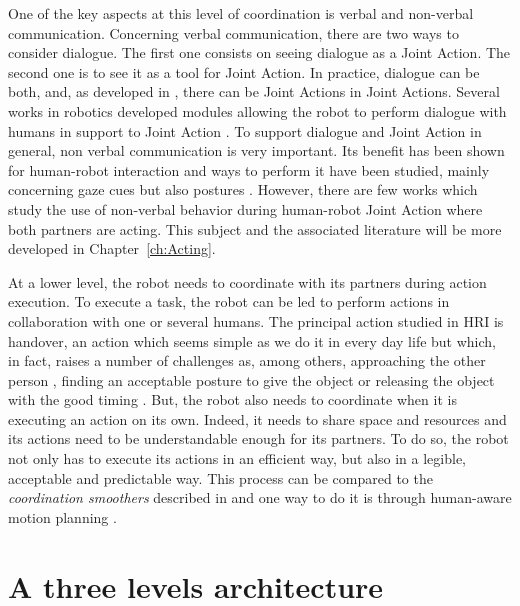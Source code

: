 \documentclass[english,a4paper,11pt,twoside]{StyleThese}
\begin{document}
One of the key aspects at this level of coordination is verbal and non-verbal communication. Concerning verbal communication, there are two ways to consider dialogue. The first one consists on seeing dialogue as a Joint Action. The second one is to see it as a tool for Joint Action. In practice, dialogue can be both, and, as developed in \cite{clark1996using}, there can be Joint Actions in Joint Actions. Several works in robotics developed modules allowing the robot to perform dialogue with humans in support to Joint Action \cite{roy2000spoken, lucignano2013dialogue, ferreira2015users}. To support dialogue and Joint Action in general, non verbal communication is very important. Its benefit has been shown for human-robot interaction \cite{breazeal2005effects} and ways to perform it have been studied, mainly concerning gaze cues \cite{boucher2010facilitative, mutlu2009footing} but also postures \cite{hart2014gesture}. However, there are few works which study the use of non-verbal behavior during human-robot Joint Action where both partners are acting. This subject and the associated literature will be more developed in Chapter~\ref{ch:Acting}.

At a lower level, the robot needs to coordinate with its partners during action execution. To execute a task, the robot can be led to perform actions in collaboration with one or several humans. The principal action studied in HRI is handover, an action which seems simple as we do it in every day life but which, in fact, raises a number of challenges as, among others, approaching the other person \cite{walters2007robotic}, finding an acceptable posture to give the object \cite{cakmak2011human, dehais2011physiological, mainprice2012sharing} or releasing the object with the good timing \cite{mason2005grip}. But, the robot also needs to coordinate when it is executing an action on its own. Indeed, it needs to share space and resources and its actions need to be understandable enough for its partners. To do so, the robot not only has to execute its actions in an efficient way, but also in a legible, acceptable and predictable way. This process can be compared to the \textit{coordination smoothers} described in \cite{vesper2010minimal} and one way to do it is through human-aware motion planning \cite{sisbot2012human, kruse2013human}.


\section{A three levels architecture}
\end{document}
